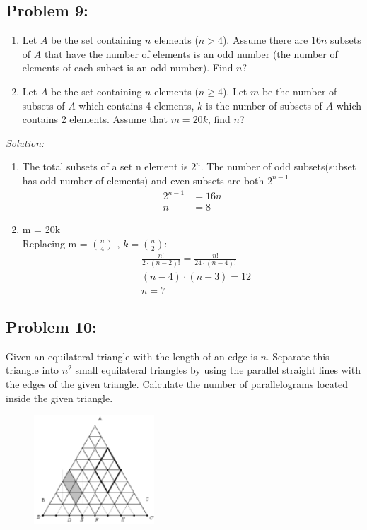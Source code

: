 \documentclass[a4paper]{article}
\begin{document}
\subsection*{Problem 9:}
\begin{enumerate}
	\item Let $A$ be the set containing $n$ elements ($n > 4$). Assume there are $16n$ subsets of $A$ that have the number of elements is an odd number (the number of elements of each subset is an odd number). Find $n$?
	\item Let $A$ be the set containing $n$ elements ($n \geq 4$). Let $m$ be the number of subsets of $A$ which contains 4 elements, $k$ is the number of subsets of $A$ which contains 2 elements. Assume that $m = 20k$, find $n$?
\end{enumerate}

\textit{Solution:}
\begin{enumerate}
	\item 
	      The total subsets of a set n element is $2^n$.
	      The number of odd subsets(subset has odd number of elements) and even subsets are both $2^{n-1}$
	      \begin{align*}
		      2^{n-1} & = 16n \\
		      n       & = 8
	      \end{align*}
	\item m  = 20k\\
	      Replacing m = ${n \choose 4}$ ,  $k = {n \choose 2}$:
	      \begin{align*}
		       & \frac{n!}{2\cdot(n-2)!} = \frac{n!}{24\cdot(n-4)!} \\
		       & (n-4)\cdot(n-3) = 12                               \\
		       & n = 7
	      \end{align*}
\end{enumerate}

\subsection*{Problem 10:}
Given an equilateral triangle with the length of an edge is $n$. Separate this triangle into $n^2$ small equilateral triangles by using the parallel straight lines with the edges of the given triangle. Calculate the number of parallelograms located inside the given triangle.
\begin{figure}[H]
	\centering
	\includegraphics[width=0.4\textwidth]{cprob10.png}
\end{figure}
\end{document}
